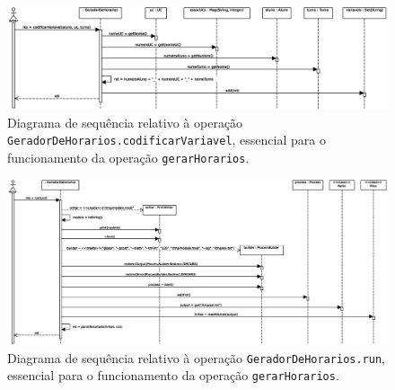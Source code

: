 \documentclass[12pt, a4paper]{article}
\begin{document}
\begin{landscape}
        \begin{figure}[H]
            \centering
            \includegraphics[scale=0.80]{Imagens/Modelos/gerarHorariosCodificarVariavelDAO.svg.eps}
            \caption{
                Diagrama de sequência relativo à operação \texttt{GeradorDeHorarios.codificarVariavel},
                essencial para o funcionamento da operação \texttt{gerarHorarios}.
            }
        \end{figure}

        \vspace*{\fill}
        \pagebreak
        \vspace*{\fill}

        \begin{figure}[H]
            \centering
            \includegraphics[scale=0.70]{Imagens/Modelos/gerarHorariosRunDAO.svg.eps}
            \caption{
                Diagrama de sequência relativo à operação \texttt{GeradorDeHorarios.run},
                essencial para o funcionamento da operação \texttt{gerarHorarios}.
            }
        \end{figure}

        \vspace*{\fill}
    \end{landscape}
\endgroup
\end{document}
